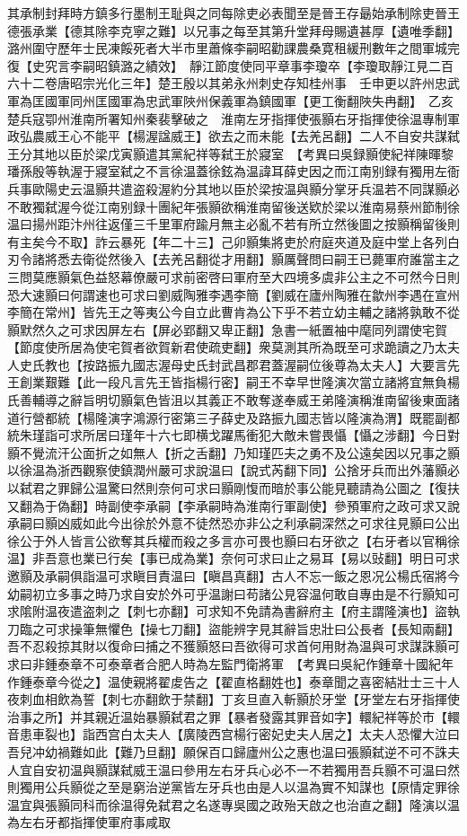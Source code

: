 其承制封拜時方鎮多行墨制王耻與之同每除吏必表聞至是晉王存朂始承制除吏晉王德張承業【德其除李克寧之難】以兄事之每至其第升堂拜母賜遺甚厚【遺唯季翻】潞州圍守歷年士民凍餒死者大半市里蕭條李嗣昭勸課農桑寛租緩刑數年之間軍城完復【史究言李嗣昭鎮潞之績效】　靜江節度使同平章事李瓊卒【李瓊取靜江見二百六十二卷唐昭宗光化三年】楚王殷以其弟永州刺史存知桂州事　壬申更以許州忠武軍為匡國軍同州匡國軍為忠武軍陜州保義軍為鎮國軍【更工衡翻陜失冉翻】　乙亥楚兵寇卾州淮南所署知州秦裴擊破之　淮南左牙指揮使張顥右牙指揮使徐温專制軍政弘農威王心不能平【楊渥諡威王】欲去之而未能【去羌呂翻】二人不自安共謀弑王分其地以臣於梁戊寅顥遣其黨紀祥等弑王於寢室　【考異曰吳録顥使紀祥陳暉黎璠孫殷等執渥于寢室弑之不言徐温蓋徐鉉為温諱耳薛史因之而江南别録有獨用左衙兵事歐陽史云温顥共遣盗殺渥約分其地以臣於梁按温與顥分掌牙兵温若不同謀顥必不敢獨弑渥今從江南别録十團紀年張顥欲稱淮南留後送欵於梁以淮南易蔡州節制徐温曰揚州距汴州往返僅三千里軍府踰月無主必亂不若有所立然後圖之按顥稱留後則有主矣今不取】詐云暴死【年二十三】己卯顥集將吏於府庭夾道及庭中堂上各列白刃令諸將悉去衛從然後入【去羌呂翻從才用翻】顥厲聲問曰嗣王已薨軍府誰當主之三問莫應顥氣色益怒幕僚嚴可求前密啓曰軍府至大四境多虞非公主之不可然今日則恐大速顥曰何謂速也可求曰劉威陶雅李遇李簡【劉威在廬州陶雅在歙州李遇在宣州李簡在常州】皆先王之等夷公今自立此曹肯為公下乎不若立幼主輔之諸將孰敢不從顥默然久之可求因屏左右【屏必郢翻又卑正翻】急書一紙置袖中麾同列謂使宅賀【節度使所居為使宅賀者欲賀新君使疏吏翻】衆莫測其所為既至可求跪讀之乃太夫人史氏教也【按路振九國志渥母史氏封武昌郡君蓋渥嗣位後尊為太夫人】大要言先王創業艱難【此一段凡言先王皆指楊行密】嗣王不幸早世隆演次當立諸將宜無負楊氏善輔導之辭旨明切顥氣色皆沮以其義正不敢奪遂奉威王弟隆演稱淮南留後東面諸道行營都統【楊隆演字鴻源行密第三子薛史及路振九國志皆以隆演為渭】既罷副都統朱瑾詣可求所居曰瑾年十六七即横戈躍馬衝犯大敵未嘗畏懾【懾之涉翻】今日對顥不覺流汗公面折之如無人【折之舌翻】乃知瑾匹夫之勇不及公遠矣因以兄事之顥以徐温為浙西觀察使鎮潤州嚴可求說温曰【說式芮翻下同】公捨牙兵而出外藩顥必以弑君之罪歸公温驚曰然則奈何可求曰顥剛愎而暗於事公能見聽請為公圖之【復扶又翻為于偽翻】時副使李承嗣【李承嗣時為淮南行軍副使】參預軍府之政可求又說承嗣曰顥凶威如此今出徐於外意不徒然恐亦非公之利承嗣深然之可求往見顥曰公出徐公于外人皆言公欲奪其兵權而殺之多言亦可畏也顥曰右牙欲之【右牙者以官稱徐温】非吾意也業已行矣【事已成為業】奈何可求曰止之易耳【易以䜴翻】明日可求邀顥及承嗣俱詣温可求瞋目責温曰【瞋昌真翻】古人不忘一飯之恩况公楊氏宿將今幼嗣初立多事之時乃求自安於外可乎温謝曰苟諸公見容温何敢自專由是不行顥知可求隂附温夜遣盗刺之【刺七亦翻】可求知不免請為書辭府主【府主謂隆演也】盜執刀臨之可求操筆無懼色【操七刀翻】盜能辨字見其辭旨忠壯曰公長者【長知兩翻】吾不忍殺掠其財以復命曰捕之不獲顥怒曰吾欲得可求首何用財為温與可求謀誅顥可求曰非鍾泰章不可泰章者合肥人時為左監門衛將軍　【考異曰吳紀作鍾章十國紀年作鍾泰章今從之】温使親將翟䖍告之【翟直格翻姓也】泰章聞之喜密結壯士三十人夜刺血相飲為誓【刺七亦翻飲于禁翻】丁亥旦直入斬顥於牙堂【牙堂左右牙指揮使治事之所】并其親近温始暴顥弑君之罪【暴者發露其罪音如字】轘紀祥等於市【轘音患車裂也】詣西宫白太夫人【廣陵西宫楊行密妃史夫人居之】太夫人恐懼大泣曰吾兒冲幼禍難如此【難乃旦翻】願保百口歸廬州公之惠也温曰張顥弑逆不可不誅夫人宜自安初温與顥謀弑威王温曰參用左右牙兵心必不一不若獨用吾兵顥不可温曰然則獨用公兵顥從之至是窮治逆黨皆左牙兵也由是人以温為實不知謀也【原情定罪徐温宜與張顥同科而徐温得免弑君之名遂專吳國之政殆天啟之也治直之翻】隆演以温為左右牙都指揮使軍府事咸取